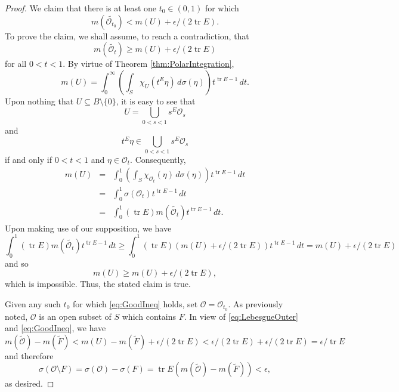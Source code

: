 \documentclass[11pt]{article}
\theoremstyle{theorem}
\newcommand\tr{\operatorname{tr}}
\begin{document}
\begin{proof}
We claim that there is at least one $t_0\in (0,1)$ for which 
\begin{equation}\label{eq:GoodIneq}
m(\widetilde{\mathcal{O}_{t_0}})< m(U)+\epsilon/(2\tr E).
\end{equation}
To prove the claim, we shall assume, to reach a contradiction, that 
\begin{equation*}
m(\widetilde{\mathcal{O}_{t}})\geq m(U)+\epsilon/(2\tr E)
\end{equation*}
for all $0<t<1$. By virtue of Theorem \ref{thm:PolarIntegration},
\begin{equation*}
m(U)=\int_{0}^\infty\left(\int_S \chi_{U}(t^E\eta)\,d\sigma(\eta)\right)t^{\tr E-1}\,dt.
\end{equation*}
Upon nothing that $U\subseteq B\setminus\{0\}$, it is easy to see that
\begin{equation*}
U=\bigcup_{0<s<1}s^E\mathcal{O}_s
\end{equation*}
and
\begin{equation*}
t^E\eta\in \bigcup_{0<s<1}s^E\mathcal{O}_s
\end{equation*}
if and only if $0<t<1$ and $\eta\in \mathcal{O}_t$. Consequently,
\begin{eqnarray*}
m(U)&=&\int_0^1\left(\int_S\chi_{\mathcal{O}_t}(\eta)\,d\sigma(\eta)\right)t^{\tr E-1}\,dt\\
&=&\int_0^1\sigma(\mathcal{O}_t)t^{\tr E-1}\,dt\\
&=&\int_0^1 (\tr E)m(\widetilde{\mathcal{O}_t})t^{\tr E-1}\,dt.
\end{eqnarray*}
Upon making use of our supposition, we have
\begin{equation*}
\int_0^1(\tr E) m(\widetilde{\mathcal{O}_t})t^{\tr E-1}\,dt\geq \int_0^1(\tr E)(m(U)+\epsilon/(2\tr E))t^{\tr E-1}\,dt=m(U)+\epsilon/(2\tr E)
\end{equation*}
and so
\begin{equation*}
m(U)\geq m(U)+\epsilon/(2\tr E),
\end{equation*}
which is impossible. Thus, the stated claim is true.

Given any such $t_0$ for which \eqref{eq:GoodIneq} holds, set $\mathcal{O}=\mathcal{O}_{t_0}$. As previously noted, $\mathcal{O}$ is an open subset of $S$ which contains $F$. In view of \eqref{eq:LebesgueOuter} and \eqref{eq:GoodIneq}, we have
\begin{equation*}
m(\widetilde{\mathcal{O}})-m(\widetilde{F})<m(U)-m(\widetilde{F})+\epsilon/(2\tr E)<\epsilon/(2\tr E)+\epsilon/(2\tr E)=\epsilon/\tr E
\end{equation*}
and therefore
\begin{equation*}
\sigma(\mathcal{O}\setminus F)=\sigma(\mathcal{O})-\sigma(F)=\tr E(m(\widetilde{\mathcal{O}})-m(\widetilde{F}))<\epsilon,
\end{equation*}
as desired.
\end{proof}
\end{document}
